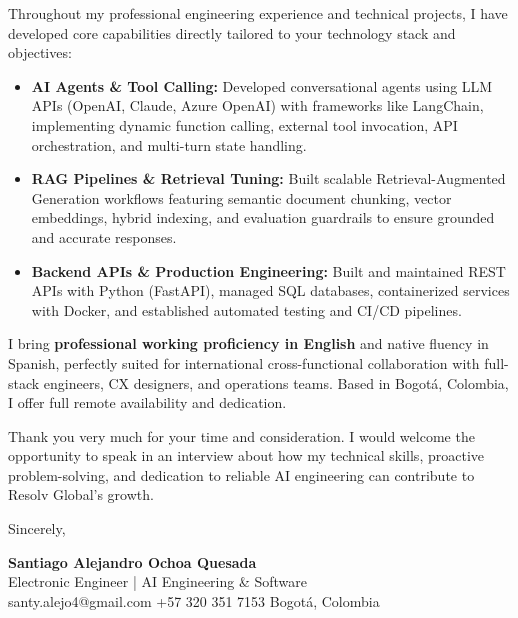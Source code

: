 \documentclass[11pt,a4paper]{article}
\begin{document}
Throughout my professional engineering experience and technical projects, I have developed core capabilities directly tailored to your technology stack and objectives:

\begin{itemize}[label={\color{accentblue}\raisebox{0.2ex}{\tiny\faCircle}}, leftmargin=1.4em, itemsep=3pt, parsep=0pt, topsep=2pt]
    \item \textbf{AI Agents \& Tool Calling:} Developed conversational agents using LLM APIs (OpenAI, Claude, Azure OpenAI) with frameworks like LangChain, implementing dynamic function calling, external tool invocation, API orchestration, and multi-turn state handling.
    \item \textbf{RAG Pipelines \& Retrieval Tuning:} Built scalable Retrieval-Augmented Generation workflows featuring semantic document chunking, vector embeddings, hybrid indexing, and evaluation guardrails to ensure grounded and accurate responses.
    \item \textbf{Backend APIs \& Production Engineering:} Built and maintained REST APIs with Python (FastAPI), managed SQL databases, containerized services with Docker, and established automated testing and CI/CD pipelines.
\end{itemize}

I bring \textbf{professional working proficiency in English} and native fluency in Spanish, perfectly suited for international cross-functional collaboration with full-stack engineers, CX designers, and operations teams. Based in Bogotá, Colombia, I offer full remote availability and dedication.

Thank you very much for your time and consideration. I would welcome the opportunity to speak in an interview about how my technical skills, proactive problem-solving, and dedication to reliable AI engineering can contribute to Resolv Global's growth.

\vspace{10pt}
\noindent Sincerely,

\vspace{12pt}
\noindent
\textbf{\large\color{accent} Santiago Alejandro Ochoa Quesada}\\
{\small\color{subtletext} Electronic Engineer | AI Engineering \& Software}\\
{\footnotesize\color{subtletext} santy.alejo4@gmail.com \;\textbar\; +57 320 351 7153 \;\textbar\; Bogot\'a, Colombia}
\end{document}
